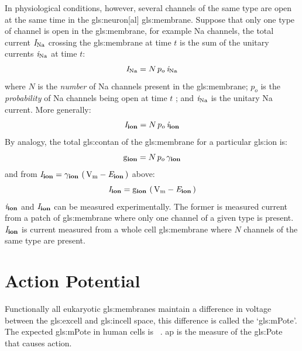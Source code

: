 \documentclass[class={myRUCProject}, crop=false]{standalone}
\begin{document}
In physiological conditions, however, several channels of the same type are open at the same time in the \gls{gls:neuron}[al] \gls{gls:membrane}. Suppose that only one type of channel is open in the \gls{gls:membrane}, for example \gls{Na} channels, the total current \(\mathit{I}_\mathrm{Na}\) crossing the \gls{gls:membrane} at time \(t\) is the sum of the unitary currents \(\mathit{i}_\mathrm{Na}\) at time \(t\):
\begin{equation}
  \mathit{I}_\mathrm{Na} = N \, p_o \, \mathit{i}_\mathrm{Na}
\end{equation}
where \(N\) is the \emph{number} of \gls{Na} channels present in the \gls{gls:membrane}; \(p_o\) is the \emph{probability} of \gls{Na} channels being open at time \(t\)
; and \(\mathit{i}_\mathrm{Na}\) is the unitary \gls{Na} current. \newline
More generally:
\begin{equation}
  \mathit{I}_\mathbf{ion}= N \, p_o \, \mathit{i}_\mathbf{ion}
\end{equation}
By analogy, the total \gls{gls:contan} of the \gls{gls:membrane} for a particular \gls{gls:ion} is: 
\begin{equation}
  \unit{\con\ion} = N \, p_o \, \uncon\ion
\end{equation}
and from \(\curr\ion= \uncon\ion \, \br{\unit{\V\membrane} - \equi\ion}\) above: 
\begin{equation}\label{eq:ionCurrent}
  \curr\ion= \unit{\con\ion} \, \br{\unit{\V\membrane} - \equi\ion}
\end{equation}
\(\mathit{i}_\mathbf{ion}\) and \(\mathit{I}_\mathbf{ion}\) can be measured experimentally. The former is measured current from a patch of \gls{gls:membrane} where only one channel of a given type is present. \(\mathit{I}_\mathbf{ion}\) is current measured from a whole cell \gls{gls:membrane} where \(N\) channels of the same type are present. 
 
\section{Action Potential}

Functionally all eukaryotic \glspl{gls:membrane} maintain a difference in voltage between the \gls{gls:excell} and \gls{gls:incell} space, this difference is called the `\gls{gls:mPote}'. The expected \gls{gls:mPote} in human cells is ~\cite{}.
\gls{ap} is the measure of the \gls{gls:Pote} that causes action.
\end{document}
